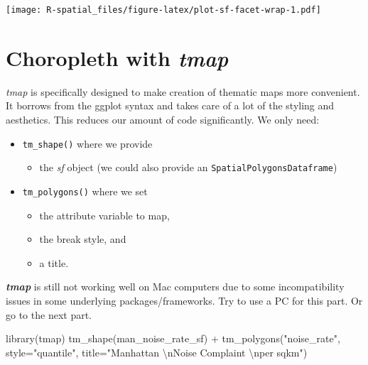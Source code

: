 \documentclass[
  11pt,
]{book}
\newenvironment{Shaded}{\begin{snugshade}}{\end{snugshade}}
\newcommand{\AttributeTok}[1]{\textcolor[rgb]{0.77,0.63,0.00}{#1}}
\newcommand{\FunctionTok}[1]{\textcolor[rgb]{0.00,0.00,0.00}{#1}}
\newcommand{\NormalTok}[1]{#1}
\newcommand{\SpecialCharTok}[1]{\textcolor[rgb]{0.00,0.00,0.00}{#1}}
\newcommand{\StringTok}[1]{\textcolor[rgb]{0.31,0.60,0.02}{#1}}
\providecommand{\tightlist}{%
  \setlength{\itemsep}{0pt}\setlength{\parskip}{0pt}}
\begin{document}
\texttt{[image: R-spatial\_files/figure-latex/plot-sf-facet-wrap-1.pdf]}

\hypertarget{choropleth-with-tmap}{%
\section{\texorpdfstring{Choropleth with \emph{tmap}}{Choropleth with tmap}}\label{choropleth-with-tmap}}

\emph{tmap} is specifically designed to make creation of thematic maps more convenient. It borrows from the ggplot syntax and takes care of a lot of the styling and aesthetics. This reduces our amount of code significantly. We only need:

\begin{itemize}
\tightlist
\item
  \texttt{tm\_shape()} where we provide

  \begin{itemize}
  \tightlist
  \item
    the \emph{sf} object (we could also provide an \texttt{SpatialPolygonsDataframe})
  \end{itemize}
\item
  \texttt{tm\_polygons()} where we set

  \begin{itemize}
  \tightlist
  \item
    the attribute variable to map,
  \item
    the break style, and
  \item
    a title.
  \end{itemize}
\end{itemize}

\textbf{\emph{tmap}} is still not working well on Mac computers due to some incompatibility issues in some underlying packages/frameworks. Try to use a PC for this part. Or go to the next part.

\begin{Shaded}
\begin{Highlighting}[]
\FunctionTok{library}\NormalTok{(tmap)}
\FunctionTok{tm\_shape}\NormalTok{(man\_noise\_rate\_sf) }\SpecialCharTok{+}
  \FunctionTok{tm\_polygons}\NormalTok{(}\StringTok{"noise\_rate"}\NormalTok{, }
              \AttributeTok{style=}\StringTok{"quantile"}\NormalTok{, }
              \AttributeTok{title=}\StringTok{"Manhattan }\SpecialCharTok{\textbackslash{}n}\StringTok{Noise Complaint }\SpecialCharTok{\textbackslash{}n}\StringTok{per sqkm"}\NormalTok{)}
\end{Highlighting}
\end{Shaded}
\end{document}
